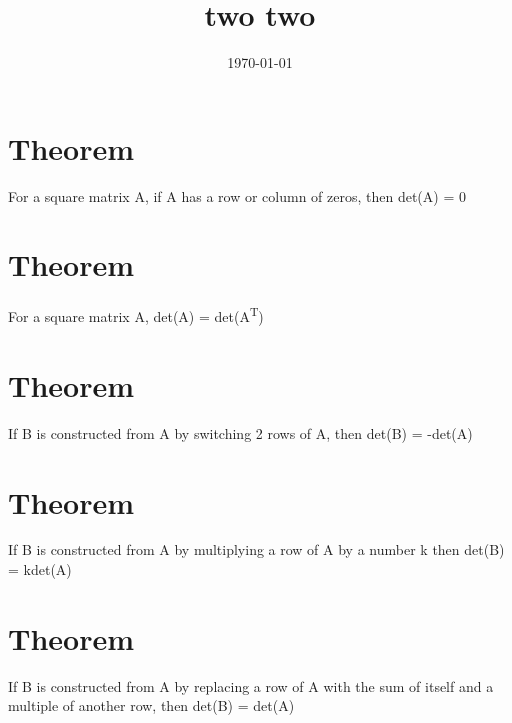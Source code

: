 \documentclass[11pt]{article}
\date{\today}
\title{two two}
\begin{document}
\maketitle
\tableofcontents

\section{Theorem}
\label{sec:orgc49209f}
For a square matrix A, if A has a row or column of zeros, then det(A) = 0
\section{Theorem}
\label{sec:org024033c}
For a square matrix A, det(A) = det(A\textsuperscript{T})
\section{Theorem}
\label{sec:orga5c6bd7}
If B is constructed from A by switching 2 rows of A, then det(B) = -det(A)
\section{Theorem}
\label{sec:org1a23cac}
If B is constructed from A by multiplying a row of A by a number k then det(B) = kdet(A)
\section{Theorem}
\label{sec:orgfdd6bb4}
If B is constructed from A by replacing a row of A with the sum of itself and a multiple of another row, then det(B) = det(A)
\end{document}
